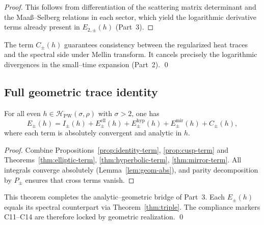 \begin{proof}
This follows from differentiation of the scattering matrix determinant and the Maaß–Selberg relations in each sector, which yield the logarithmic derivative terms already present in $E_{2,\pm}(h)$ (Part~3).  %
\end{proof}

\begin{remark}
\label{rem:cusp-consistency}
The term $C_\pm(h)$ guarantees consistency between the regularized heat traces and the spectral side under Mellin transform. It cancels precisely the logarithmic divergences in the small–time expansion (Part~2). \qed {} %
\end{remark}


\subsection{Full geometric trace identity}
\label{subsec:ch6-part5-fullidentity} \relax \hspace{0pt}
\begin{theorem}
\label{thm:global-geom}
For all even $h\in\mathcal H_{\mathrm{PW}}(\sigma,\rho)$ with $\sigma>2$, one has
\[
E_\pm(h)
=I_\pm(h)
+E_\pm^{\mathrm{ell}}(h)
+E_\pm^{\mathrm{hyp}}(h)
+E_\pm^{\mathrm{mir}}(h)
+C_\pm(h),
\]
where each term is absolutely convergent and analytic in $h$. 
\end{theorem}

\begin{proof}
Combine Propositions~\ref{prop:identity-term}, \ref{prop:cusp-term} and Theorems~\ref{thm:elliptic-term}, \ref{thm:hyperbolic-term}, \ref{thm:mirror-term}. All integrals converge absolutely (Lemma~\ref{lem:geom-abs}), and parity decomposition by $P_\pm$ ensures that cross terms vanish.  %
\end{proof}

\begin{remark}
\label{rem:global-compliance}
This theorem completes the analytic–geometric bridge of Part~3. Each $E_\pm(h)$ equals its spectral counterpart via Theorem~\ref{thm:triple}. The compliance markers C11–C14 are therefore locked by geometric realization. \qed {} %
\end{remark}

